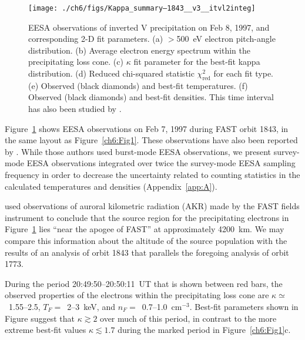   \begin{figure}
    \centering
    \noindent\texttt{[image: ./ch6/figs/Kappa\_summary--1843\_\_v3\_\_itvl2integ]}
    \caption[Inverted V precipitation and best-fit Maxwellian and kappa
    distribution parameters (Orbit 1843)]{EESA observations of inverted V
      precipitation on Feb 8, 1997, and corresponding 2-D fit parameters. (a)
      $>$500~eV electron pitch-angle distribution. (b) Average electron energy spectrum
      within the precipitating loss cone. (c) $\kappa$ fit parameter for the
      best-fit kappa distribution. (d) Reduced chi-squared statistic
      $\chi^2_{\mathrm{red}}$ for each fit type. (e) Observed (black diamonds)
      and best-fit temperatures. (f) Observed (black diamonds) and best-fit
      densities. This time interval has also been studied by
      \citet{Ergun1998a,Ergun1998}.}
    \label{ch6:Fig4}
  \end{figure}


  Figure~\ref{ch6:Fig4} shows EESA observations on Feb 7, 1997 during FAST orbit
  1843, in the same layout as Figure~\ref{ch6:Fig1}. These observations have
  also been reported by \citet{Ergun1998a,Ergun1998}. While those authors used
  burst-mode EESA observations, we present survey-mode EESA observations
  integrated over twice the survey-mode EESA sampling frequency in order
  to decrease the uncertainty related to counting statistics in the calculated
  temperatures and densities (Appendix~\ref{app:A}).

  \citet{Ergun1998} used observations of auroral kilometric radiation (AKR) made
  by the FAST fields instrument \citep{Ergun2001} to conclude that the source
  region for the precipitating electrons in Figure~\ref{ch6:Fig4} lies ``near
  the apogee of FAST'' at approximately 4200~km. We may compare this information
  about the altitude of the source population with the results of an analysis of
  orbit 1843 that parallels the foregoing analysis of orbit 1773.

  During the period 20:49:50--20:50:11~UT that is shown between red bars, the
  observed properties of the electrons within the precipitating loss cone are
  $\kappa \simeq $~1.55--2.5, $T_F =$~2--3~keV, and $n_F =$~0.7--1.0~cm$^{-3}$.
  Best-fit parameters shown in Figure suggest that $\kappa \gtrsim 2$ over much of this period,
  in contrast to the more extreme best-fit values $\kappa \lesssim 1.7$ during
  the marked period in Figure~\ref{ch6:Fig1}c.


